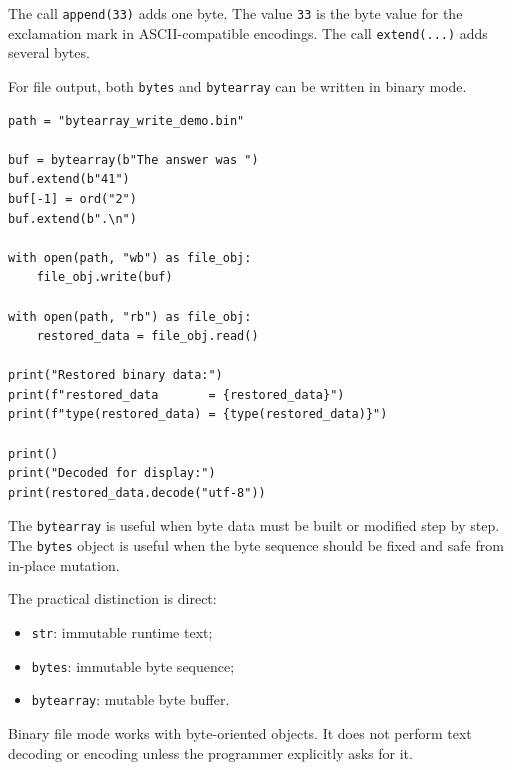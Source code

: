 The call \texttt{append(33)} adds one byte. The value \texttt{33} is the byte value for the exclamation mark in ASCII-compatible encodings. The call \texttt{extend(...)} adds several bytes.

For file output, both \texttt{bytes} and \texttt{bytearray} can be written in binary mode.

\begin{verbatim}
path = "bytearray_write_demo.bin"

buf = bytearray(b"The answer was ")
buf.extend(b"41")
buf[-1] = ord("2")
buf.extend(b".\n")

with open(path, "wb") as file_obj:
    file_obj.write(buf)

with open(path, "rb") as file_obj:
    restored_data = file_obj.read()

print("Restored binary data:")
print(f"restored_data       = {restored_data}")
print(f"type(restored_data) = {type(restored_data)}")

print()
print("Decoded for display:")
print(restored_data.decode("utf-8"))
\end{verbatim}

The \texttt{bytearray} is useful when byte data must be built or modified step by step. The \texttt{bytes} object is useful when the byte sequence should be fixed and safe from in-place mutation.

The practical distinction is direct:

\begin{itemize}
    \item \texttt{str}: immutable runtime text;
    \item \texttt{bytes}: immutable byte sequence;
    \item \texttt{bytearray}: mutable byte buffer.
\end{itemize}

Binary file mode works with byte-oriented objects. It does not perform text decoding or encoding unless the programmer explicitly asks for it.